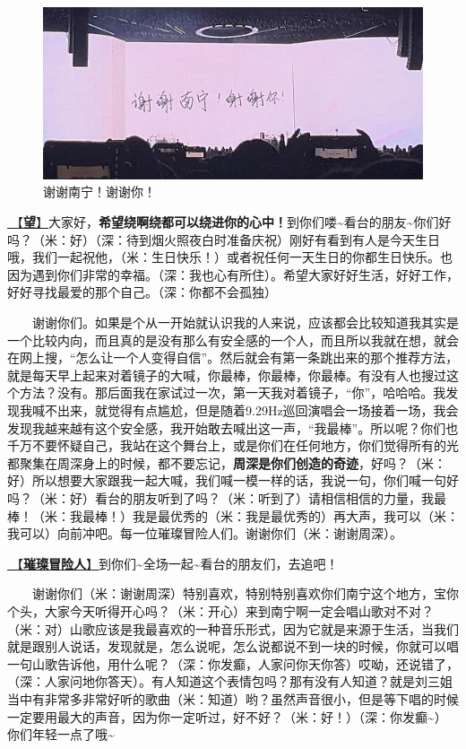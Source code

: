 \documentclass[]{ctexbook}
\begin{document}
\begin{figure}

{\centering \includegraphics[width=400pt]{img/nanning20241206/thank-nanning} 

}

\caption{谢谢南宁！谢谢你！}\label{fig:unnamed-chunk-154}
\end{figure}

\hyperref[hope]{🎵【\textbf{望}】}大家好，\textbf{希望绕啊绕都可以绕进你的心中！}到你们喽\textasciitilde 看台的朋友\textasciitilde 你们好吗？（米：好）（深：待到烟火照夜白时准备庆祝）刚好有看到有人是今天生日哦，我们一起祝他，（米：生日快乐！）或者祝任何一天生日的你都生日快乐。也因为遇到你们非常的幸福。（深：我也心有所住）。希望大家好好生活，好好工作，好好寻找最爱的那个自己。（深：你都不会孤独）

  谢谢你们。如果是个从一开始就认识我的人来说，应该都会比较知道我其实是一个比较内向，而且真的是没有那么有安全感的一个人，而且所以我就在想，就会在网上搜，``怎么让一个人变得自信''。然后就会有第一条跳出来的那个推荐方法，就是每天早上起来对着镜子的大喊，你最棒，你最棒，你最棒。有没有人也搜过这个方法？没有。那后面我在家试过一次，第一天我对着镜子，``你''，哈哈哈。我发现我喊不出来，就觉得有点尴尬，但是随着9.29Hz巡回演唱会一场接着一场，我会发现我越来越有这个安全感，我开始敢去喊出这一声，``我最棒''。所以呢？你们也千万不要怀疑自己，我站在这个舞台上，或是你们在任何地方，你们觉得所有的光都聚集在周深身上的时候，都不要忘记，\textbf{周深是你们创造的奇迹}，好吗？（米：好）所以想要大家跟我一起大喊，我们喊一模一样的话，我说一句，你们喊一句好吗？（米：好）看台的朋友听到了吗？（米：听到了）请相信相信的力量，我最棒！（米：我最棒！）我是最优秀的（米：我是最优秀的）再大声，我可以（米：我可以）向前冲吧。每一位璀璨冒险人们。谢谢你们（米：谢谢周深）。

\hyperref[adventurers]{🎵【\textbf{璀璨冒险人}】}到你们\textasciitilde 全场一起\textasciitilde 看台的朋友们，去追吧！

  谢谢你们（米：谢谢周深）特别喜欢，特别特别喜欢你们南宁这个地方，宝你个头，大家今天听得开心吗？（米：开心）来到南宁啊一定会唱山歌对不对？（米：对）山歌应该是我最喜欢的一种音乐形式，因为它就是来源于生活，当我们就是跟别人说话，发现就是，怎么说呢，怎么说都说不到一块的时候，你就可以唱一句山歌告诉他，用什么呢？（深：你发癫，人家问你天你答）哎呦，还说错了，（深：人家问地你答天）。有人知道这个表情包吗？那有没有人知道？就是刘三姐当中有非常多非常好听的歌曲（米：知道）哟？虽然声音很小，但是等下唱的时候一定要用最大的声音，因为你一定听过，好不好？（米：好！）（深：你发癫\textasciitilde）你们年轻一点了哦\textasciitilde{}
\end{document}
